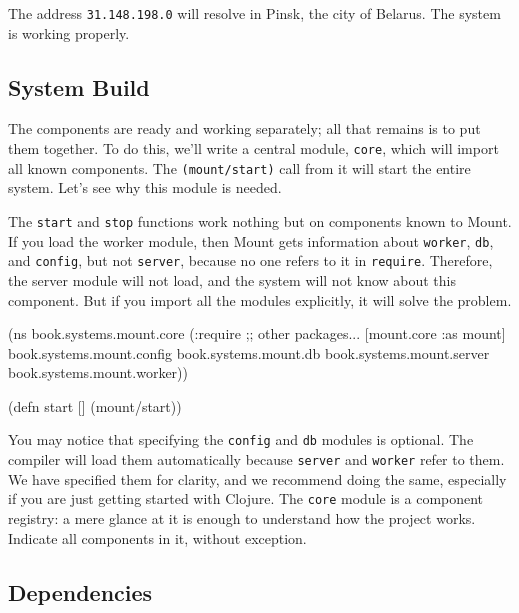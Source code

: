 \fi

The address \verb|31.148.198.0| will resolve in Pinsk, the city of Belarus. The system is working properly.

\subsection{System Build}


The components are ready and working separately; all that remains is to put them together. To do this, we'll write a central module, \verb|core|, which will import all known components. The \verb|(mount/start)| call from it will start the entire system. Let's see why this module is needed.

The \verb|start| and \verb|stop| functions work nothing but on components known to Mount. If you load the worker module, then Mount gets information about \verb|worker|, \verb|db|, and \verb|config|, but not \verb|server|, because no one refers to it in \verb|require|. Therefore, the server module will not load, and the system will not know about this component. But if you import all the modules explicitly, it will solve the problem.

\label{mount-main}

\begin{english}
  \begin{clojure}
(ns book.systems.mount.core
  (:require
   ;; other packages...
   [mount.core :as mount]
   book.systems.mount.config
   book.systems.mount.db
   book.systems.mount.server
   book.systems.mount.worker))

(defn start []
  (mount/start))
  \end{clojure}
\end{english}

You may notice that specifying the \verb|config| and \verb|db| modules is optional. The compiler will load them automatically because \verb|server| and \verb|worker| refer to them. We have specified them for clarity, and we recommend doing the same, especially if you are just getting started with Clojure. The \verb|core| module is a component registry: a mere glance at it is enough to understand how the project works. Indicate all components in it, without exception.

\subsection{Dependencies}

